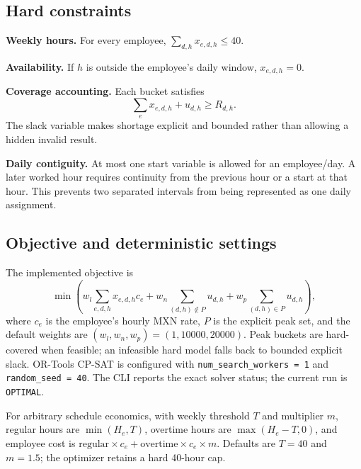 \documentclass[11pt,a4paper]{article}
\begin{document}
\subsection{Hard constraints}
\textbf{Weekly hours.} For every employee, $\sum_{d,h}x_{e,d,h}\le40$.

\textbf{Availability.} If $h$ is outside the employee's daily window, $x_{e,d,h}=0$.

\textbf{Coverage accounting.} Each bucket satisfies
\[
\sum_e x_{e,d,h}+u_{d,h}\ge R_{d,h}.
\]
The slack variable makes shortage explicit and bounded rather than allowing a hidden invalid result.

\textbf{Daily contiguity.} At most one start variable is allowed for an employee/day. A later worked hour requires continuity from the previous hour or a start at that hour. This prevents two separated intervals from being represented as one daily assignment.

\subsection{Objective and deterministic settings}
The implemented objective is
\[
\min\left(w_l\sum_{e,d,h}x_{e,d,h}c_e+w_n\sum_{(d,h)\notin P}u_{d,h}+w_p\sum_{(d,h)\in P}u_{d,h}\right),
\]
where $c_e$ is the employee's hourly MXN rate, $P$ is the explicit peak set, and the default weights are $(w_l,w_n,w_p)=(1,10000,20000)$. Peak buckets are hard-covered when feasible; an infeasible hard model falls back to bounded explicit slack. OR-Tools CP-SAT is configured with \texttt{num\_search\_workers = 1} and \texttt{random\_seed = 40}. The CLI reports the exact solver status; the current run is \texttt{OPTIMAL}.

For arbitrary schedule economics, with weekly threshold $T$ and multiplier $m$, regular hours are $\min(H_e,T)$, overtime hours are $\max(H_e-T,0)$, and employee cost is $\text{regular}\times c_e+\text{overtime}\times c_e\times m$. Defaults are $T=40$ and $m=1.5$; the optimizer retains a hard 40-hour cap.
\end{document}
